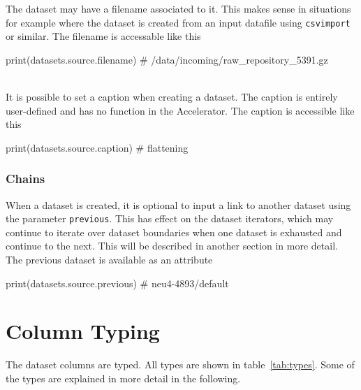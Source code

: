 The dataset may have a filename associated to it.  This makes sense in
situations for example where the dataset is created from an input
datafile using \texttt{csvimport} or similar.  The filename is
accessable like this

\begin{python}
print(datasets.source.filename)
# /data/incoming/raw_repository_5391.gz
\end{python}
\\
It is possible to set a caption when creating a dataset.  The caption
is entirely user-defined and has no function in the Accelerator.  The
caption is accessible like this

\begin{python}
print(datasets.source.caption)
# flattening
\end{python}



\subsubsection{Chains}

When a dataset is created, it is optional to input a link to another
dataset using the parameter \texttt{previous}.  This has effect on the
dataset iterators, which may continue to iterate over dataset
boundaries when one dataset is exhausted and continue to the next.
This will be described in another section in more detail.  The
previous dataset is available as an attribute

\begin{python}
print(datasets.source.previous)
# neu4-4893/default
\end{python}



\newpage
\section{Column Typing}
The dataset columns are typed.  All types are shown in table~\ref{tab:types}.
Some of the types are explained in more detail in the following.

